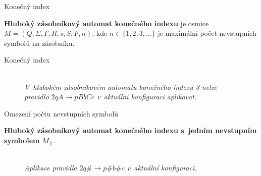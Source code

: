 \documentclass[a4paper,fyma3]{prosper}
\theoremstyle{definition}
\begin{document}
\begin{slide}{Konečný index}

\bigskip


\textbf{Hluboký zásobníkový automat konečného indexu} je osmice $M = (Q,\Sigma,\Gamma, R, s, S, F, n)$, kde $n \in \{1,2,3,\dots\}$ je maximální počet nevstupních symbolů na zásobníku.


\end{slide}

\begin{slide}{Konečný index}

\bigskip
\bigskip
\bigskip

\begin{figure}[h!]
\centering
{} \bigskip \\
\emph{V~hlubokém zásobníkovém automatu konečného indexu 3  nelze pravidlo $2 q A \rightarrow p BbCc$ v~aktuální konfiguraci aplikovat.}
\end{figure}


\end{slide}



\begin{slide}{Omezení počtu nevstupních symbolů}

\bigskip
\textbf{Hluboký zásobníkový automat konečného indexu s~jedním nevstupním symbolem} $M_\#$.
\bigskip

\begin{figure}[h!]
\centering
{} \bigskip \\
\emph{Aplikace pravidla $2 q \# \rightarrow p \#b\#c$ v~aktuální konfiguraci.}
\end{figure}


\end{slide}
\end{document}
